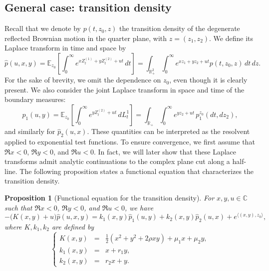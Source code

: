 \documentclass[11pt]{article}
\newtheorem{prop}[thm]{Proposition}
\theoremstyle{definition}
\begin{document}
\subsection{General case: transition density}

Recall that we denote by $p(t,z_0,z)$ the transition density of the degenerate reflected Brownian motion in the quarter plane, with $z=(z_1,z_2)$. We define its Laplace transform in time and space by
\begin{equation}
\label{eq:Lap_main}
 \widehat p (u,x,y)= \mathbb{E}_{z_0} \!\left[ \int_0^\infty e^{x Z_t^{(1)}+y Z_t^{(2)} + ut} \, dt \right]
 = \int_{\mathbb R_+^2}\!\int_{0}^\infty e^{x z_1+yz_2+ut}p(t,z_0,z)\, dt\, dz.
\end{equation}
For the sake of brevity, we omit the dependence on $z_0$, even though it is clearly present.
We also consider the joint Laplace transform in space and time of the boundary measures:
\begin{equation}
\label{eq:Lap1_main}
    \widehat p_1(u,y) = \mathbb{E}_{z_0} \!\left[ \int_0^\infty e^{y Z_t^{(2)} + ut} \, dL_t^1 \right]
    = \int_{\mathbb R_+}\!\int_{0}^\infty e^{yz_2+ut} \, p_1^{z_0}(dt, dz_2),
\end{equation}
and similarly for $\widehat p_2(u,x)$.
These quantities can be interpreted as the resolvent applied to exponential test functions. 
To ensure convergence, we first assume that $\Re x<0$, $\Re y<0$, and $\Re u<0$. In fact, we will later show that these Laplace transforms admit analytic continuations to the complex plane cut along a half-line.
The following proposition states a functional equation that characterizes the transition density.

\begin{prop}[Functional equation for the transition density]
For $x,y,u\in\mathbb{C}$ such that $\Re x<0$, $\Re y<0$, and $\Re u<0$, we have
\begin{equation}
    \label{eq:main_eq}
    -\bigl(K(x,y)+u\bigr)\widehat{p}(u,x,y)
    = k_1(x,y) \widehat{p}_1(u,y)
    + k_2(x,y) \widehat{p}_2(u,x)
    + e^{\langle (x,y),z_0\rangle},
\end{equation}
where $K,k_1,k_2$ are defined by
\begin{equation}
\label{eq:def_parameters_Maxence}
    \left\{
    \begin{array}{rcl}
    K(x,y) & = & \frac{1}{2}(x^2+y^2+2\rho xy)+\mu_1x+\mu_2y,\\
    k_1(x,y) & = & x+r_1y,\\
    k_2(x,y) & = & r_2x+y.
    \end{array}
    \right.
\end{equation}
\end{prop}
\end{document}
